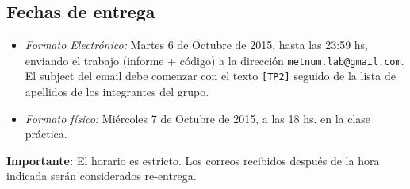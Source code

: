     \subsection*{Fechas de entrega}
        \begin{itemize}
            \item \emph{Formato Electr\'onico:} Martes 6 de Octubre de 2015, hasta las 23:59 hs, enviando el trabajo (informe + c\'odigo) a la direcci\'on \verb+metnum.lab@gmail.com+. El subject del email debe comenzar con el texto \verb+[TP2]+ seguido de la lista de apellidos de los integrantes del grupo.
            \item \emph{Formato f\'isico:} Mi\'ercoles 7 de Octubre de 2015, a las 18 hs. en la clase pr\'actica.
        \end{itemize}

        \noindent \textbf{Importante:} El horario es estricto. Los correos recibidos despu\'es de la hora indicada ser\'an considerados re-entrega.  

